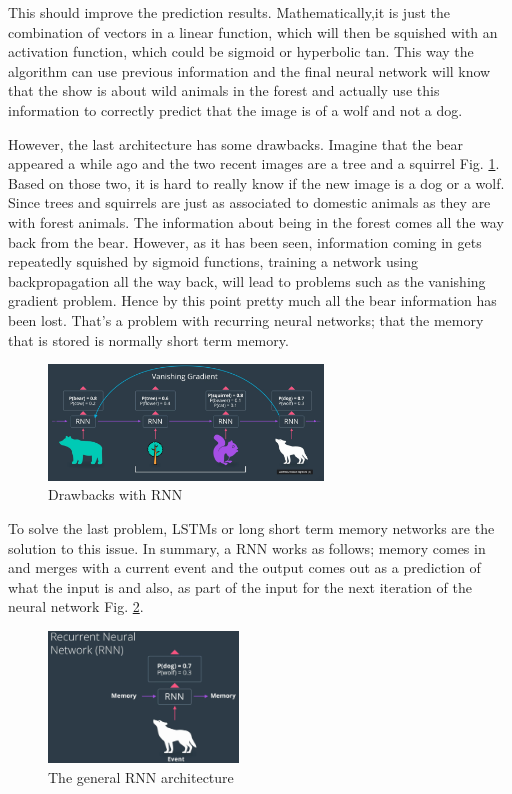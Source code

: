 \documentclass{article}
\begin{document}
This should improve the prediction results. Mathematically,it is just the combination of vectors in a linear function, which will then be squished with an activation function, which could be sigmoid or hyperbolic tan. This way the algorithm can use previous information and the final neural network will know that the show is about wild animals in the forest and actually use this information to correctly predict that the image is of a wolf and not a dog.

However, the last architecture has some drawbacks. Imagine that the bear appeared a while ago and the two recent images are a tree and a squirrel Fig. \ref{fig:f3}. Based on those two, it is hard to really know if the new image is a dog or a wolf. Since trees and squirrels are just as associated to domestic animals as they are with forest animals. The information about being in the forest comes all the way back from the bear. However, as it has been seen, information coming in gets repeatedly squished by sigmoid functions, training a network using backpropagation all the way back, will lead to problems such as the vanishing gradient problem. Hence by this point pretty much all the bear information has been lost. That's a problem with recurring neural networks; that the memory that is stored is normally short term memory.

\begin{figure}[ht]
    \centering
    \includegraphics[width=0.65\textwidth,height=0.65\textheight,keepaspectratio]{images/drawback_rnn.png}
    \captionsetup{justification=centering}
    \caption{Drawbacks with RNN}
    \label{fig:f3}
\end{figure}

To solve the last problem, LSTMs or long short term memory networks are the solution to this issue. 
In summary, a RNN works as follows; memory comes in and merges with a current event and the output comes out as a prediction of what the input is and also, as part of the input for the next iteration of the neural network Fig. \ref{fig:f4}.

\begin{figure}[ht]
    \centering
    \includegraphics[width=0.45\textwidth,height=0.45\textheight,keepaspectratio]{images/rnn.png}
    \captionsetup{justification=centering}
    \caption{The general RNN architecture}
    \label{fig:f4}
\end{figure}
\end{document}
